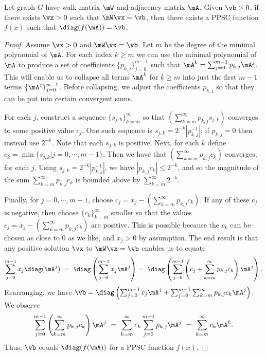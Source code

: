 \begin{theorem}\label{thm:pos-suff-condition}
    Let graph $G$ have walk matrix $\mW$ and adjacency matrix $\mA$.
    Given $\vb > 0$, if there exists $\vx > 0$ such that $\mW\vx = \vb$, then there exists a PPSC function $f(x)$ such that $\diag(f(\mA)) = \vb$.
\end{theorem}
\begin{proof}
    Assume $\vx > 0$ and $\mW\vx =  \vb$.
    Let $m$ be the degree of the minimal polynomial of $\mA$.
    For each index $k \geq m$ we can use the minimal polynomial of $\mA$ to produce a set of coefficients $\{ p_{k,j} \}_{j=0}^{m-1}$ such that
    $\mA^k = \sum_{j=0}^{m-1} p_{k,j} \mA^j$.
    This will enable us to collapse all terms $\mA^k$ for $k\geq m$ into just the first $m-1$ terms $\{\mA^j\}_{j=0}^{m-1}$.
    Before collapsing, we adjust the coefficients $p_{k,j}$ so that they can be put into certain convergent sums.

    For each $j$, construct a sequence $\{s_{j,k}\}_{k=m}^{\infty}$ so that $\left(\sum_{k=m}^{\infty} p_{k,j} s_{j,k} \right)$ converges to some positive value $c_j$. One such sequence is $s_{j,k} = 2^{-k} |p_{k,j}^{-1}|$; if $p_{k,j} = 0$ then instead use $2^{-k}$.
    Note that each $s_{j,k}$ is positive. Next, for each $k$ define $c_k = \min\{  s_{j,k} | j=0,\cdots,m-1 \}$. Then we have that $\left( \sum_{k=m}^{\infty} p_{k,j} c_k \right)$ converges, for each $j$.
    Using $s_{j,k} = 2^{-k} |p_{k,j}^{-1}|$, we have $|p_{k,j}c_k| \leq 2^{-k}$, and so the magnitude of the sum $\sum_{k=m}^{\infty} p_{k,j} c_k$ is bounded above by $\sum_{k=m}^{\infty} 2^{-k}$.

    Finally, for $j=0, \cdots, m-1$, choose $c_j = x_j - \left( \sum_{k=m}^{\infty} p_{k,j} c_k \right)$.
    If any of these $c_j$ is negative, then choose $\{ c_k \}_{k=m}^{\infty}$ smaller so that the values $c_j = x_j - \left( \sum_{k=m}^{\infty} p_{k,j} c_k \right)$ are positive. This is possible because the $c_k$ can be chosen as close to 0 as we like, and $x_j > 0$ by assumption.
    The end result is that any positive solution $\vx$ to $\mW\vx = \vb$ enables us to equate
    \[
        \sum_{j=0}^{m-1} x_j \diag(\mA^j) \hspace{3pt} =
        \hspace{3pt} \diag\left( \sum_{j=0}^{m-1} x_j \mA^j \right)
            = \hspace{3pt} \diag\left( \sum_{j=0}^{m-1} \left( c_j +  \sum_{k=m}^{\infty} p_{k,j} c_k \right) \mA^j \right).
    \]
    Rearranging, we have $\vb = \diag\left( \sum_{j=0}^{m-1} c_j \mA^j +  \sum_{j=0}^{m-1}\sum_{k=m}^{\infty} p_{k,j} c_k \mA^j \right)$.
    We observe
    \[
       \sum_{j=0}^{m-1} \left( \sum_{k=m}^{\infty} p_{k,j} c_k \right) \mA^j
     \hspace{3pt} = \hspace{3pt}
       \sum_{k=m}^{\infty} c_k \sum_{j=0}^{m-1} p_{k,j}  \mA^j
     \hspace{3pt} = \hspace{3pt}
        \sum_{k=m}^{\infty} c_k \mA^k .
    \]
    Thus, $\vb$ equals $\diag(f(\mA))$ for a PPSC function $f(x)$.
\end{proof}

